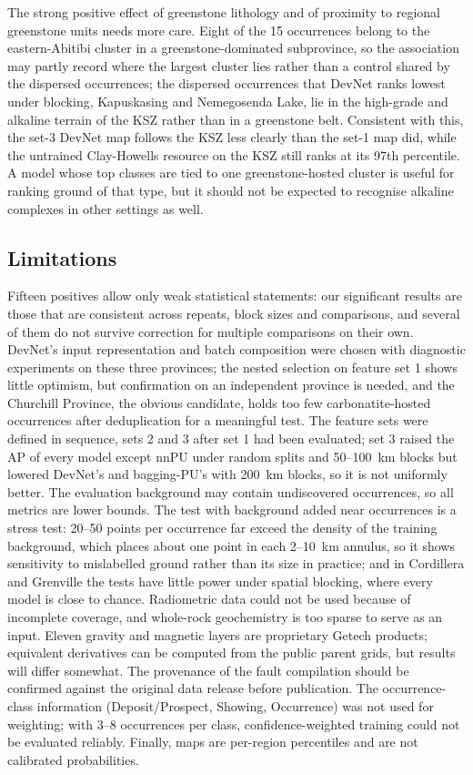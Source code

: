 \documentclass[pdflatex,sn-apa]{sn-jnl}
\begin{document}
The strong positive effect of greenstone lithology and of proximity to regional greenstone units needs more care. Eight of the 15 occurrences belong to the eastern-Abitibi cluster in a greenstone-dominated subprovince, so the association may partly record where the largest cluster lies rather than a control shared by the dispersed occurrences; the dispersed occurrences that DevNet ranks lowest under blocking, Kapuskasing and Nemegosenda Lake, lie in the high-grade and alkaline terrain of the KSZ rather than in a greenstone belt. Consistent with this, the set-3 DevNet map follows the KSZ less clearly than the set-1 map did, while the untrained Clay-Howells resource on the KSZ still ranks at its 97th percentile. A model whose top classes are tied to one greenstone-hosted cluster is useful for ranking ground of that type, but it should not be expected to recognise alkaline complexes in other settings as well.

\subsection{Limitations}\label{sec:limitations}

Fifteen positives allow only weak statistical statements: our significant results are those that are consistent across repeats, block sizes and comparisons, and several of them do not survive correction for multiple comparisons on their own. DevNet's input representation and batch composition were chosen with diagnostic experiments on these three provinces; the nested selection on feature set 1 shows little optimism, but confirmation on an independent province is needed, and the Churchill Province, the obvious candidate, holds too few carbonatite-hosted occurrences after deduplication for a meaningful test. The feature sets were defined in sequence, sets 2 and 3 after set 1 had been evaluated; set 3 raised the AP of every model except nnPU under random splits and 50--100~km blocks but lowered DevNet's and bagging-PU's with 200~km blocks, so it is not uniformly better. The evaluation background may contain undiscovered occurrences, so all metrics are lower bounds. The test with background added near occurrences is a stress test: 20--50 points per occurrence far exceed the density of the training background, which places about one point in each 2--10~km annulus, so it shows sensitivity to mislabelled ground rather than its size in practice; and in Cordillera and Grenville the tests have little power under spatial blocking, where every model is close to chance. Radiometric data could not be used because of incomplete coverage, and whole-rock geochemistry is too sparse to serve as an input. Eleven gravity and magnetic layers are proprietary Getech products; equivalent derivatives can be computed from the public parent grids, but results will differ somewhat. The provenance of the fault compilation should be confirmed against the original data release before publication. The occurrence-class information (Deposit/Prospect, Showing, Occurrence) was not used for weighting; with 3--8 occurrences per class, confidence-weighted training could not be evaluated reliably. Finally, maps are per-region percentiles and are not calibrated probabilities.
\end{document}

